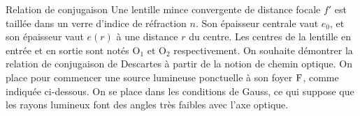 \begin{exo}[PC][2][TD]{Relation de conjugaison}
Une lentille mince convergente de distance focale $f'$ est taillée dans un verre d'indice de réfraction $n$. Son épaisseur centrale vaut $e_0$, et son épaisseur vaut $e(r)$ à une distance $r$ du centre. Les centres de la lentille en entrée et en sortie sont notés O$_1$ et O$_2$ respectivement. On souhaite démontrer la relation de conjugaison de Descartes  à partir de la notion de chemin optique. On place pour commencer une source lumineuse ponctuelle à son foyer $\rm F$, comme indiquée ci-dessous. On se place dans les conditions de Gauss, ce qui suppose que les rayons lumineux font des angles très faibles avec l'axe optique.


\end{exo}
